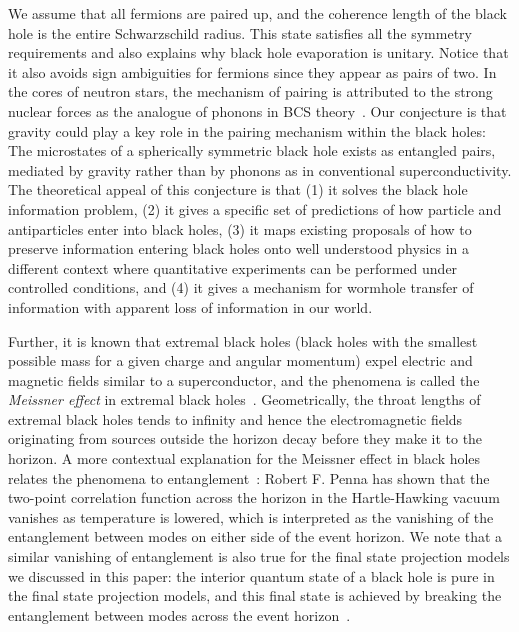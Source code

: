 \documentclass[10pt,letterpaper,aps,onecolumn,superscriptaddress,floatfix,notitlepage]{revtex4-1}
\begin{document}
	We assume that all fermions are paired up, and the coherence length of the black hole is the entire Schwarzschild radius. This state satisfies all the symmetry requirements and also explains why black hole evaporation is unitary. Notice that it also avoids sign ambiguities for fermions since they appear as pairs of two. In the cores of neutron stars, the mechanism of pairing is attributed to the strong nuclear forces as the analogue of phonons in BCS theory~\cite{superfluidity,neutron2,neutron1}. Our conjecture is that gravity could play a key role in the pairing mechanism within the black holes: The microstates of a spherically symmetric black hole exists as entangled pairs, mediated by gravity rather than by phonons as in conventional superconductivity.  The theoretical appeal of this conjecture is that (1) it solves the black hole information problem, (2) it gives a specific set of predictions of how particle and antiparticles enter into black holes, (3) it maps existing proposals of how to preserve information entering black holes onto well understood physics in a different context where quantitative experiments can be performed under controlled conditions, and (4) it gives a mechanism for wormhole transfer of information with apparent loss of information in our world.
	
	Further, it is known that extremal black holes (black holes with the smallest possible mass for a given charge and angular momentum) expel electric and magnetic fields similar to a superconductor, and the phenomena is called the \textit{Meissner effect} in extremal black holes~\cite{king1975black}. Geometrically, the throat lengths of extremal black holes tends to infinity and hence the electromagnetic fields originating from sources outside the horizon  decay before they make it to the horizon. A more contextual explanation for the Meissner effect in black holes relates the phenomena to entanglement~\cite{penna2014black}: Robert F. Penna has shown that the two-point correlation function across the horizon in the Hartle-Hawking vacuum vanishes as temperature is lowered, which is interpreted as the vanishing of the entanglement between modes on either side of the event horizon. We note that a similar vanishing of entanglement is also true for the final state projection models we discussed in this paper: the interior quantum state of a black hole is pure in the final state projection models, and this final state is achieved by breaking the entanglement between modes across the event horizon~\cite{projection,horowitz}.
	
\end{document}
